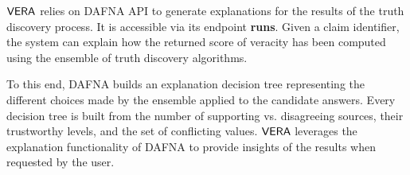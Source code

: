 $\mathsf{VERA}$ relies on DAFNA API \cite{Wagui15} to generate explanations for the results of the truth discovery process. 
It is accessible via its endpoint \textbf{runs}. Given a claim identifier, the system can explain how the returned score of veracity has been
computed using the  ensemble of truth discovery algorithms. %

To this end, DAFNA builds an explanation decision tree representing the different
choices made by the ensemble applied to the candidate answers. 
Every decision tree is  built from the
number of supporting vs. disagreeing sources,  their trustworthy levels, and the set of conflicting values. $\mathsf{VERA}$ leverages the explanation functionality of DAFNA  to provide insights of the results when requested by the
user.
